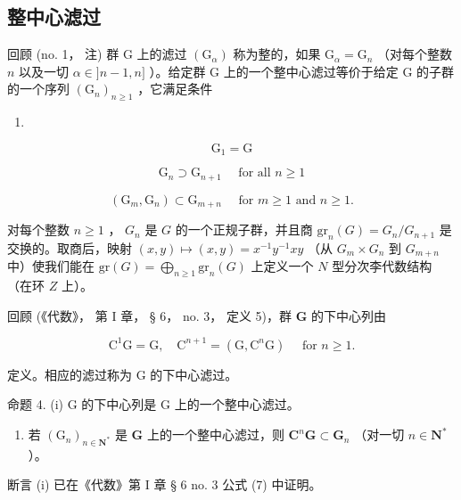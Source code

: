 \subsection{整中心滤过}

回顾 (no. 1， 注) 群 G 上的滤过 \((\mathrm{G}_{\alpha})\) 称为整的，如果 \(\mathrm{G}_{\alpha} = \mathrm{G}_{n}\) （对每个整数 \(n\) 以及一切 \(\alpha \in ]n - 1,n]\) ）。给定群 G 上的一个整中心滤过等价于给定 G 的子群的一个序列 \((\mathrm{G}_n)_{n\geqslant 1}\) ，它满足条件

\begin{enumerate}
\def\labelenumi{(\roman{enumi})}
\tightlist
\item
\end{enumerate}

\[
\mathrm{G} _ {1} = \mathrm{G}\tag{i}
\]

\[
\mathrm{G} _ {n} \supset \mathrm{G} _ {n + 1} \quad \text { for   all } n \geqslant 1\tag{ii}
\]

\[
\left(\mathrm{G} _ {m}, \mathrm{G} _ {n}\right) \subset \mathrm{G} _ {m + n} \quad \text { for } m \geqslant 1 \text { and } n \geqslant 1.\tag{iii}
\]

对每个整数 \(n \geqslant 1\) ， \(G_n\) 是 \(G\) 的一个正规子群，并且商 \(\mathrm{gr}_n(G) = G_n / G_{n+1}\) 是交换的。取商后，映射 \((x,y) \mapsto (x,y) = x^{-1}y^{-1}xy\) （从 \(G_m \times G_n\) 到 \(G_{m+n}\) 中）使我们能在 \(\mathrm{gr}(G) = \bigoplus_{n \geqslant 1} \mathrm{gr}_n(G)\) 上定义一个 \(N\) 型分次李代数结构（在环 \(Z\) 上）。

回顾 (《代数》， 第 I 章， § 6， no. 3， 定义 5)，群 \(\mathbf{G}\) 的下中心列由

\[
\mathrm{C} ^ {1} \mathrm{G} = \mathrm{G}, \quad \mathrm{C} ^ {n + 1} = (\mathrm{G}, \mathrm{C} ^ {n} \mathrm{G}) \quad \text { for } n \geqslant 1.\tag{28}
\]

定义。相应的滤过称为 G 的下中心滤过。

命题 4. (i) G 的下中心列是 G 上的一个整中心滤过。

\begin{enumerate}
\def\labelenumi{(\roman{enumi})}
\setcounter{enumi}{1}
\tightlist
\item
  若 \((\mathrm{G}_n)_{n\in \mathbf{N}^*}\) 是 \(\mathbf{G}\) 上的一个整中心滤过，则 \(\mathbf{C}^n\mathbf{G}\subset \mathbf{G}_n\) （对一切 \(n\in \mathbf{N}^*\) ）。
\end{enumerate}

断言 (i) 已在《代数》第 I 章 § 6 no. 3 公式 (7) 中证明。

